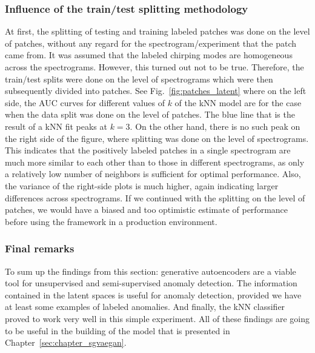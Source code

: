 \subsubsection{Influence of the train/test splitting methodology}
At first, the splitting of testing and training labeled patches was done on the level of patches, without any regard for the spectrogram/experiment that the patch came from. It was assumed that the labeled chirping modes are homogeneous across the spectrograms. However, this turned out not to be true. Therefore, the train/test splits were done on the level of spectrograms which were then subsequently divided into patches. See Fig.~\ref{fig:patches_latent} where on the left side, the AUC curves for different values of $k$ of the kNN model are for the case when the data split was done on the level of patches. The blue line that is the result of a kNN fit peaks at $k=3$. On the other hand, there is no such peak on the right side of the figure, where splitting was done on the level of spectrograms. This indicates that the positively labeled patches in a single spectrogram are much more similar to each other than to those in different spectrograms, as only a relatively low number of neighbors is sufficient for optimal performance. Also, the variance of the right-side plots is much higher, again indicating larger differences across spectrograms. If we continued with the splitting on the level of patches, we would have a biased and too optimistic estimate of performance before using the framework in a production environment.

\subsubsection{Final remarks}
To sum up the findings from this section: generative autoencoders are a viable tool for unsupervised and semi-supervised anomaly detection. The information contained in the latent spaces is useful for anomaly detection, provided we have at least some examples of labeled anomalies. And finally, the kNN classifier proved to work very well in this simple experiment. All of these findings are going to be useful in the building of the model that is presented in Chapter~\ref{sec:chapter_sgvaegan}. 